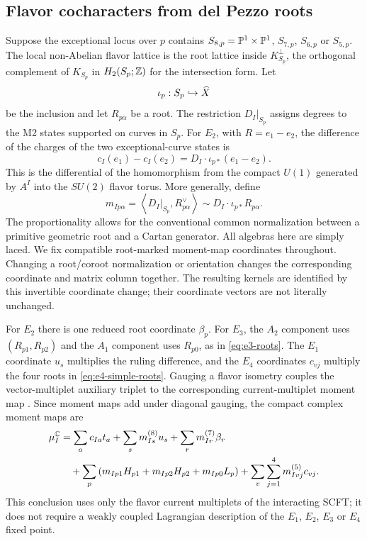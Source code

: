 \subsection{Flavor cocharacters from del Pezzo roots}
\label{subsec:flavor-cocharacters}

Suppose the exceptional locus over $p$ contains
$S_{8,p}=\mathbb P^1\times\mathbb P^1$, $S_{7,p}$, $S_{6,p}$ or $S_{5,p}$.
The local non-Abelian flavor lattice is the root
lattice inside $K_{S_p}^{\perp}$, the orthogonal complement of $K_{S_p}$ in
$H_2(S_p;\mathbb Z)$ for the intersection form. Let
\begin{equation}
 \iota_p:S_p\hookrightarrow\widehat X
\end{equation}
be the inclusion and let $R_{p\alpha}$ be a root. The restriction
$D_I|_{S_p}$ assigns degrees to the M2 states supported on curves in $S_p$.
For $E_2$, with $R=e_1-e_2$, the difference of the charges of the two
exceptional-curve states is
\begin{equation}
 c_I(e_1)-c_I(e_2)
 =D_I\cdot\iota_{p*}(e_1-e_2).
 \label{eq:e2-charge-difference}
\end{equation}
This is the differential of the homomorphism from the compact $U(1)$ generated
by $A^I$ into the $SU(2)$ flavor torus. More generally, define
\begin{equation}
 m_{Ip\alpha}
 =\left\langle D_I|_{S_p},R_{p\alpha}^{\vee}\right\rangle
 \sim D_I\cdot\iota_{p*}R_{p\alpha}.
 \label{eq:cocharacter}
\end{equation}
The proportionality allows for the conventional common normalization between
a primitive geometric root and a Cartan generator. All algebras here are
simply laced. We fix compatible root-marked moment-map coordinates throughout.
Changing a root/coroot normalization or orientation changes the corresponding
coordinate and matrix column together. The resulting kernels are identified
by this invertible coordinate change; their coordinate vectors are not
literally unchanged.

For $E_2$ there is one reduced root coordinate $\beta_p$. For $E_3$, the
$A_2$ component uses $(R_{p1},R_{p2})$ and the $A_1$ component uses $R_{p0}$,
as in \eqref{eq:e3-roots}. The $E_1$ coordinate $u_s$ multiplies the ruling
difference, and the $E_4$ coordinates $c_{vj}$ multiply the four roots in
\eqref{eq:e4-simple-roots}. Gauging a flavor isometry couples the
vector-multiplet auxiliary triplet to the corresponding current-multiplet
moment map \cite{Ceresole:2000}. Since moment maps add under diagonal
gauging, the compact complex moment maps are
\begin{equation}
 \begin{aligned}
 \mu_I^{\mathbb C}
 &=\sum_a c_{Ia}t_a+\sum_s m^{(8)}_{Is}u_s
  +\sum_r m^{(7)}_{Ir}\beta_r\\
 &\quad+\sum_p\left(
     m_{Ip1}H_{p1}+m_{Ip2}H_{p2}+m_{Ip0}L_p
   \right)+\sum_v\sum_{j=1}^4m^{(5)}_{Ivj}c_{vj}.
 \end{aligned}
 \label{eq:compact-complex-mm}
\end{equation}
This conclusion uses only the flavor current multiplets of the interacting
SCFT; it does not require a weakly coupled Lagrangian description of the
$E_1$, $E_2$, $E_3$ or $E_4$ fixed point.

